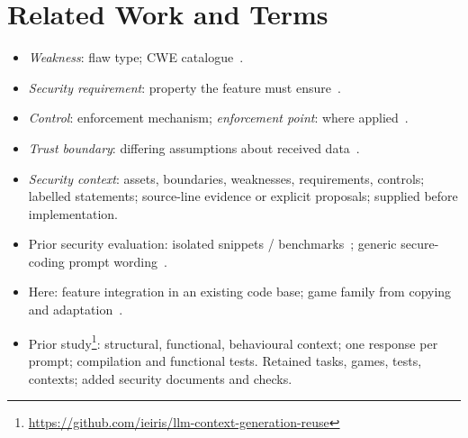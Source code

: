 \section{Related Work and Terms}
\label{sec:related}

\begin{itemize}
\item \emph{Weakness}: flaw type; CWE catalogue~\citep{cwe}.
\item \emph{Security requirement}: property the feature must ensure~\citep{haley2008}.
\item \emph{Control}: enforcement mechanism;
\emph{enforcement point}: where applied~\citep{nist80053}.
\item \emph{Trust boundary}: differing assumptions about received data~\citep{manadhata2011}.
\item \emph{Security context}: assets, boundaries, weaknesses,
requirements, controls; labelled statements; source-line evidence or
explicit proposals; supplied before implementation.
\item Prior security evaluation: isolated snippets /
benchmarks~\citep{pearce2022,siddiq2022,hajipour2024}; generic
secure-coding prompt wording~\citep{tony2025}.
\item Here: feature integration in an existing code base; game family
from copying and adaptation~\citep{krueger2018,dubinsky2013}.
\item Prior study\footnote{\url{https://github.com/ieiris/llm-context-generation-reuse}}:
structural, functional, behavioural context; one response per prompt;
compilation and functional tests. Retained tasks, games, tests, contexts;
added security documents and checks.
\end{itemize}
